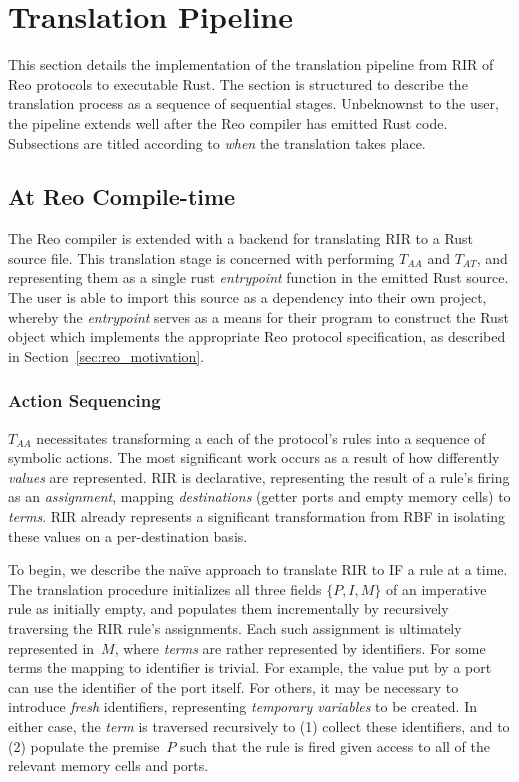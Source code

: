 \section{Translation Pipeline}
\label{sec:translation_pipeline}
This section details the implementation of the translation pipeline from RIR of Reo protocols to executable Rust. The section is structured to describe the translation process as a sequence of sequential stages. Unbeknownst to the user, the pipeline extends well after the Reo compiler has emitted Rust code. Subsections are titled according to \textit{when} the translation takes place.

\subsection{At Reo Compile-time}
\label{sec:translation_phase_1}
The Reo compiler is extended with a backend for translating RIR to a Rust source file. This translation stage is concerned with performing $T_{AA}$ and $T_{AT}$, and representing them as a single rust \textit{entrypoint} function in the emitted Rust source. The user is able to import this source as a dependency into their own project, whereby the \textit{entrypoint} serves as a means for their program to construct the Rust object which implements the appropriate Reo protocol specification, as described in Section~\ref{sec:reo_motivation}.

\subsubsection{Action Sequencing}
$T_{AA}$ necessitates transforming a each of the protocol's rules into a sequence of symbolic actions. The most significant work occurs as a result of how differently \textit{values} are represented. RIR is declarative, representing the result of a rule's firing as an \textit{assignment}, mapping \textit{destinations} (getter ports and empty memory cells) to \textit{terms}. RIR already represents a significant transformation from RBF in isolating these values on a per-destination basis. 

To begin, we describe the na\"ive approach to translate RIR to IF a rule at a time. The translation procedure initializes all three fields $\{P, I, M\}$ of an imperative rule as initially empty, and populates them incrementally by recursively traversing the RIR rule's assignments. Each such assignment is ultimately represented in~$M$, where \textit{terms} are rather represented by identifiers. For some terms the mapping to identifier is trivial. For example, the value put by a port can use the identifier of the port itself. For others, it may be necessary to introduce \textit{fresh} identifiers, representing \textit{temporary variables} to be created. In either case, the \textit{term} is traversed recursively to (1) collect these identifiers, and to (2) populate the premise~$P$ such that the rule is fired given access to all of the relevant memory cells and ports.


